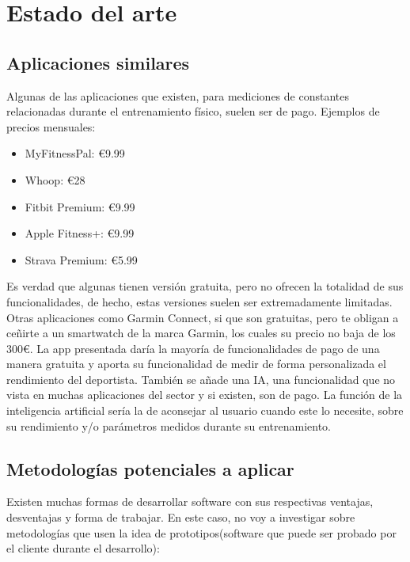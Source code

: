 \chapter{Estado del arte}
\section{Aplicaciones similares}

Algunas de las aplicaciones que existen, para mediciones de constantes relacionadas durante el entrenamiento físico, suelen ser de pago. Ejemplos de precios mensuales:

\begin{itemize}
	\item MyFitnessPal: €9.99
	\item Whoop: €28
	\item Fitbit Premium: €9.99
	\item Apple Fitness+: €9.99
	\item Strava Premium: €5.99
\end{itemize}

Es verdad que algunas tienen versión gratuita, pero no ofrecen la totalidad de sus funcionalidades, de hecho, estas versiones suelen ser extremadamente limitadas. Otras aplicaciones como Garmin Connect, si que son gratuitas, pero te obligan a ceñirte a un smartwatch de la marca Garmin, los cuales su precio no baja de los 300€. 
La app presentada daría la mayoría de funcionalidades de pago de una manera gratuita y aporta su funcionalidad de medir de forma personalizada el rendimiento del deportista. También se añade una IA, una funcionalidad que no vista en muchas aplicaciones del sector y si existen, son de pago. La función de la inteligencia artificial sería la de aconsejar al usuario cuando este lo necesite, sobre su rendimiento y/o parámetros medidos durante su entrenamiento.

\section{Metodologías potenciales a aplicar}

Existen muchas formas de desarrollar software con sus respectivas ventajas, desventajas y forma de trabajar. En este caso, no voy a investigar sobre metodologías que usen la idea de prototipos(software que puede ser probado por el cliente durante el desarrollo):

